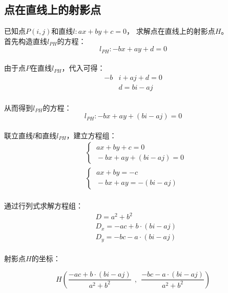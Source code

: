 \documentclass[UTF8]{ctexart}
\begin{document}
\subsection{点在直线上的射影点}
    已知点$P(i,j)$和直线$l:ax+by+c=0$，
    求解点在直线上的射影点$H$。\\[3mm]
    首先构造直线$l_{PH}$的方程：
    \setcounter{equation}{0}
    \begin{equation}
        l_{PH}:-bx+ay+d=0
    \end{equation}\\
    由于点$P$在直线$l_{PH}$，代入可得：
    \begin{align}
        -b&i+aj+d=0\\[2mm]
        &d=bi-aj
    \end{align}\\
    从而得到$l_{PH}$的方程：
    \begin{equation}
        l_{PH}:-bx+ay+(bi-aj)=0
    \end{equation}\\
    联立直线$l$和直线$l_{PH}$，建立方程组：\vspace{5pt}
    \begin{align}
        &\begin{cases}
            \ ax+by+c=0\\
            \ -bx+ay+(bi-aj)=0
        \end{cases}\\[6mm]
        &\begin{cases}
            \ ax+by=-c\\
            \ -bx+ay=-(bi-aj)
        \end{cases}
    \end{align}\\
    通过行列式求解方程组：
    \begin{align}
        &D=a^2+b^2\\[3mm]
        &D_x=-ac+b\cdot(bi-aj)\\[3mm]
        &D_y=-bc-a\cdot(bi-aj)
    \end{align}\\
    射影点$H$的坐标：\vspace{5pt}
    \begin{large}
        \begin{equation*}
            H\left(\frac{-ac+b\cdot(bi-aj)}{a^2+b^2}~~,~~\frac{-bc-a\cdot(bi-aj)}{a^2+b^2}\right)
        \end{equation*}
    \end{large}
\end{document}

